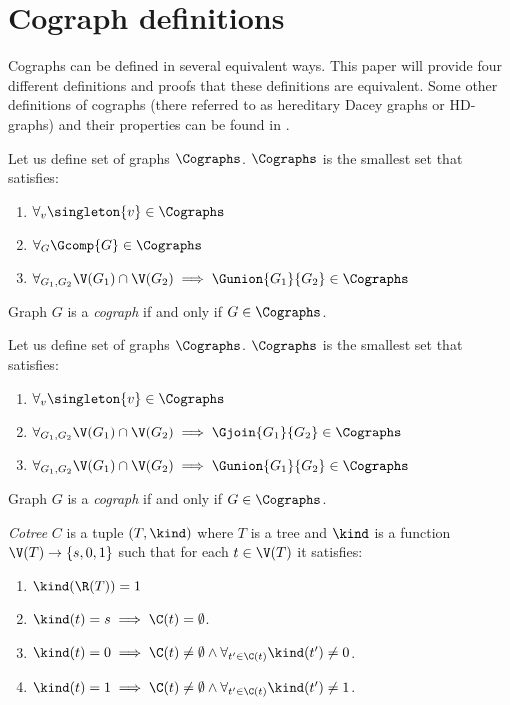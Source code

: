 
\section{Cograph definitions}

Cographs can be defined in several equivalent ways. This paper will provide four different definitions and proofs that these definitions are equivalent. Some other definitions of cographs (there referred to as hereditary Dacey graphs or HD-graphs) and their properties can be found in \cite{sumner}.

\begin{defi}\label{codef1}
    Let us define set of graphs $\Cographs$. $\Cographs$ is the smallest set that satisfies:
    \begin{enumerate}
        \item $\forall_v \singleton{v} \in \Cographs$
        \item $\forall_G \Gcomp{G} \in \Cographs$
        \item $\forall_{G_1, G_2} \V(G_1) \cap \V(G_2) \implies \Gunion{G_1}{G_2} \in \Cographs$
    \end{enumerate}
    Graph $G$ is a \emph{cograph} if and only if $G \in \Cographs$.
\end{defi}
\begin{defi}\label{codef2}
    Let us define set of graphs $\Cographs$. $\Cographs$ is the smallest set that satisfies:
    \begin{enumerate}
        \item $\forall_v \singleton{v} \in \Cographs$
        \item $\forall_{G_1, G_2} \V(G_1) \cap \V(G_2) \implies \Gjoin{G_1}{G_2} \in \Cographs$
        \item $\forall_{G_1, G_2} \V(G_1) \cap \V(G_2) \implies \Gunion{G_1}{G_2} \in \Cographs$
    \end{enumerate}
    Graph $G$ is a \emph{cograph} if and only if $G \in \Cographs$.
\end{defi}

\begin{defi}
    \emph{Cotree} $C$ is a tuple $(T, \kind)$ where $T$ is a tree and $\kind$ is a function $\V(T) \to \{s,0,1\}$ such that for each $t \in \V(T)$ it satisfies:
    \begin{enumerate}
        \item $\kind(\R(T)) = 1$
        \item $\kind(t) = s \implies \C(t) = \emptyset$.
        \item $\kind(t) = 0 \implies \C(t) \neq \emptyset \land \forall_{t' \in \C(t)} \kind(t') \neq 0$.
        \item $\kind(t) = 1 \implies \C(t) \neq \emptyset \land \forall_{t' \in \C(t)} \kind(t') \neq 1$.
    \end{enumerate}
\end{defi}

